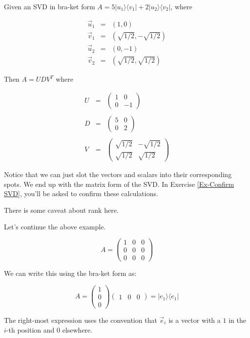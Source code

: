 \documentclass{amsbook}
\begin{document}
\begin{tcolorbox}[title=Example,colback=blue!5]
Given an SVD in bra-ket form $A=5|u_1\rangle\langle v_1|+2|u_2\rangle\langle v_2|$, where

$$
\begin{array}{rcl}
\vec u_1 &=& (1, 0) \\
\vec v_1 &=& (\sqrt{1/2}, -\sqrt{1/2}) \\
\vec u_2 &=& (0, -1) \\
\vec v_2 &=& (\sqrt{1/2}, \sqrt{1/2})
\end{array}
$$

Then $A=UDV^T$ where

$$
\begin{array}{rcl}
U &=& \left(
\begin{array}{cc}
1 & 0 \\
0 & -1
\end{array}
\right)\\
\\
D&=&\left(
\begin{array}{ccc}
5 & 0 \\
0 & 2
\end{array}
\right)\\
\\
V&=&\left(
\begin{array}{ccc}
\sqrt{1/2} & -\sqrt{1/2} \\
\sqrt{1/2} & \sqrt{1/2}
\end{array}
\right)
\end{array}
$$

Notice that we can just slot the vectors and scalars into their corresponding spots.  We end up with the matrix form of the SVD.  In Exercise \ref{Ex-Confirm SVD}, you'll be asked to confirm these calculations.
\end{tcolorbox}

There is some caveat about rank here.

\begin{tcolorbox}[title=Example,colback=blue!5]
Let's continue the above example.

$$
A=\left(\begin{array}{ccc}1&0&0\\0&0&0\\0&0&0\end{array}\right)
$$

We can write this using the bra-ket form as:

$$
A=\left(\begin{array}{c}1\\0\\0\end{array}\right)\left(\begin{array}{ccc}1&0&0\end{array}\right) = |e_1\rangle\langle e_1|
$$

The right-most expression uses the convention that $\vec e_i$ is a vector with a $1$ in the $i$-th position and $0$ elsewhere.
\end{tcolorbox}
\end{document}
